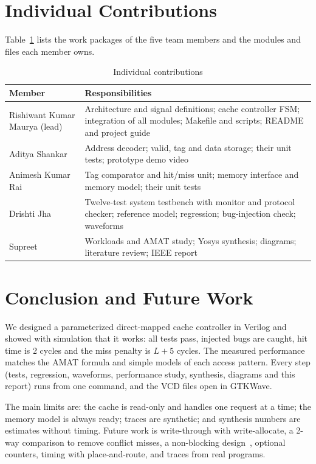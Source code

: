 \documentclass[conference]{IEEEtran}
\DeclareRobustCommand{\code}[1]{\texttt{\detokenize{#1}}}
\begin{document}
\section{Individual Contributions}\label{sec:contrib}
Table~\ref{tab:contrib} lists the work packages of the five team members and the modules and files each member owns.

\begin{table}[t]
\caption{Individual contributions}\label{tab:contrib}
\centering\small
\begin{tabular}{@{}p{}p{}@{}}
\toprule
Member & Responsibilities\\
\midrule
Rishiwant Kumar Maurya (lead) & Architecture and signal definitions; cache controller FSM; integration of all modules; Makefile and scripts; README and project guide\\
Aditya Shankar & Address decoder; valid, tag and data storage; their unit tests; prototype demo video\\
Animesh Kumar Rai & Tag comparator and hit/miss unit; memory interface and memory model; their unit tests\\
Drishti Jha & Twelve-test system testbench with monitor and protocol checker; reference model; regression; bug-injection check; waveforms\\
Supreet & Workloads and AMAT study; Yosys synthesis; diagrams; literature review; IEEE report\\
\bottomrule
\end{tabular}
\end{table}

\section{Conclusion and Future Work}\label{sec:concl}
We designed a parameterized direct-mapped cache controller in Verilog and showed with simulation that it works: all tests pass, injected bugs are caught, hit time is 2 cycles and the miss penalty is $L+5$ cycles. The measured performance matches the AMAT formula and simple models of each access pattern. Every step (tests, regression, waveforms, performance study, synthesis, diagrams and this report) runs from one \code{make} command, and the VCD files open in GTKWave.

The main limits are: the cache is read-only and handles one request at a time; the memory model is always ready; traces are synthetic; and synthesis numbers are estimates without timing. Future work is write-through with write-allocate, a 2-way comparison to remove conflict misses, a non-blocking design~\cite{kroft1981}, optional counters, timing with place-and-route, and traces from real programs.
\end{document}
